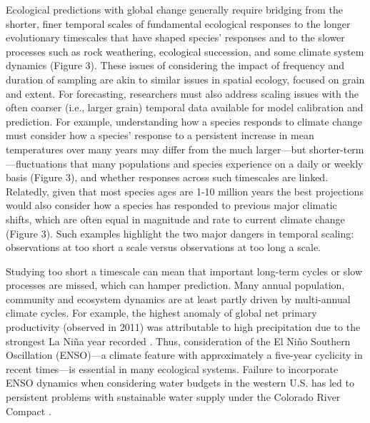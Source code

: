 \documentclass[11pt,a4paper,oneside]{article}
\begin{document}
Ecological predictions with global change generally require bridging from the shorter, finer temporal scales of fundamental ecological responses to the longer evolutionary timescales that have shaped species' responses and to the slower processes such as rock weathering, ecological succession, and some climate system dynamics (Figure 3). These issues of considering the impact of frequency and duration of sampling are akin to similar issues in spatial ecology, focused on grain and extent. For forecasting, researchers must also address scaling issues with the often coarser (i.e., larger grain) temporal data available for model calibration and prediction. For example, understanding how a species responds to climate change must consider how a species' response to a persistent increase in mean temperatures over many years may differ from the much larger---but shorter-term---fluctuations that many populations and species experience on a daily or weekly basis (Figure 3), and whether responses across such timescales are linked. Relatedly, given that most species ages are 1-10 million years \citep{lawtonbook} the best projections would also consider how a species has responded to previous major climatic shifts, which are often equal in magnitude and rate to current climate change (Figure 3). Such examples highlight the two major dangers in temporal scaling: observations at too short a scale versus observations at too long a scale.

Studying too short a timescale can mean that important long-term cycles or slow processes are missed, which can hamper prediction. Many annual population, community and ecosystem dynamics are at least partly driven by multi-annual climate cycles. For example, the highest anomaly of global net primary productivity (observed in 2011) was attributable to high precipitation due to the strongest La Ni\~na year recorded \citep{bastos2013}. Thus, consideration of the El Ni\~no Southern Oscillation (ENSO)---a climate feature with approximately a five-year cyclicity in recent times---is essential in many ecological systems. Failure to incorporate ENSO dynamics when considering water budgets in the western U.S. has led to persistent problems with sustainable water supply under the Colorado River Compact \citep{Christensen2004}.
\end{document}
